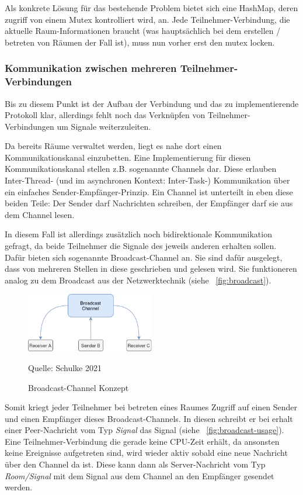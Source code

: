 \documentclass{article}
\newcommand{\figuresource}[1]{
	\begin{center}Quelle: #1\end{center}
}
\begin{document}
\begin{onecolumn}
Als konkrete Lösung für das bestehende Problem bietet sich eine HashMap, deren
zugriff von einem Mutex kontrolliert wird, an. Jede Teilnehmer-Verbindung, die
aktuelle Raum-Informationen braucht (was hauptsächlich bei dem erstellen /
betreten von Räumen der Fall ist), muss nun vorher erst den mutex locken. 

\subsubsection{Kommunikation zwischen mehreren Teilnehmer-Verbindungen}

Bis zu diesem Punkt ist der Aufbau der Verbindung und das zu implementierende
Protokoll klar, allerdings fehlt noch das Verknüpfen von
Teilnehmer-Verbindungen um Signale weiterzuleiten.

Da bereits Räume verwaltet werden, liegt es nahe dort einen Kommunikationskanal
einzubetten. Eine Implementierung für diesen Kommunikationskanal stellen z.B.
sogenannte Channels dar. Diese erlauben Inter-Thread- (und im asynchronen
Kontext: Inter-Task-) Kommunikation über ein einfaches
Sender-Empfänger-Prinzip. Ein Channel ist unterteilt in eben diese beiden
Teile: Der Sender darf Nachrichten schreiben, der Empfänger darf sie aus dem
Channel lesen.

In diesem Fall ist allerdings zusätzlich noch bidirektionale Kommunikation
gefragt, da beide Teilnehmer die Signale des jeweils anderen erhalten sollen.
Dafür bieten sich sogenannte Broadcast-Channel an. Sie sind dafür ausgelegt,
dass von mehreren Stellen in diese geschrieben und gelesen wird. Sie
funktioneren analog zu dem Broadcast aus der Netzwerktechnik (siehe
\figurename~\ref{fig:broadcast}).

\begin{figure}[ht]
	\includegraphics[width=0.5\textwidth]{diagram-broadcast}
	\centering
	\caption{Broadcast-Channel Konzept}\label{fig:broadcast-channel}
	\figuresource{Schulke 2021}
\end{figure}

Somit kriegt jeder Teilnehmer bei betreten eines Raumes Zugriff auf einen
Sender und einen Empfänger dieses Broadcast-Channels. In diesen schreibt er bei
erhalt einer Peer-Nachricht vom Typ \textit{Signal} das Signal (siehe
\figurename~\ref{fig:broadcast-usage}). Eine Teilnehmer-Verbindung die gerade
keine CPU-Zeit erhält, da ansonsten keine Ereignisse aufgetreten sind, wird
wieder aktiv sobald eine neue Nachricht über den Channel da ist.  Diese kann
dann als Server-Nachricht vom Typ \textit{Room/Signal} mit dem Signal aus dem
Channel an den Empfänger gesendet werden.


\end{onecolumn}
\end{document}

